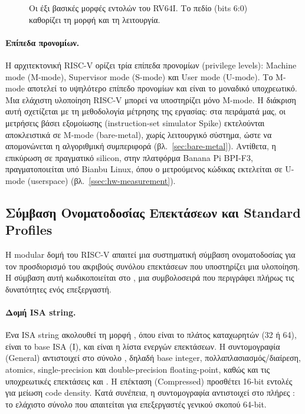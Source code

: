 \begin{figure}[htbp]
  \centering
  
  \caption[Βασικές μορφές εντολών RISC-V]{Οι έξι βασικές μορφές εντολών του RV64I. Το πεδίο  (bits 6:0) καθορίζει τη μορφή και τη λειτουργία.}
  \label{fig:rv64-formats}
\end{figure}

\paragraph{Επίπεδα προνομίων.}
Η αρχιτεκτονική RISC-V ορίζει τρία επίπεδα προνομίων (privilege levels):
Machine mode (M-mode), Supervisor mode (S-mode) και User mode (U-mode). Το
M-mode αποτελεί το υψηλότερο επίπεδο προνομίων και είναι το μοναδικό
υποχρεωτικό. Μια ελάχιστη υλοποίηση RISC-V μπορεί να υποστηρίζει μόνο
M-mode. Η διάκριση αυτή σχετίζεται με τη μεθοδολογία μέτρησης της εργασίας: 
στα πειράματά μας, οι μετρήσεις βάσει εξομοίωσης (instruction-set
simulator Spike) εκτελούνται αποκλειστικά σε M-mode (bare-metal),
χωρίς λειτουργικό σύστημα, ώστε να απομονώνεται η αλγοριθμική συμπεριφορά
(βλ.~\cref{sec:bare-metal}). Αντίθετα, η επικύρωση σε πραγματικό silicon,
στην πλατφόρμα Banana Pi BPI-F3, πραγματοποιείται υπό Bianbu Linux, όπου ο
μετρούμενος κώδικας εκτελείται σε U-mode (userspace) (βλ.~\cref{ssec:hw-measurement}).

\subsection{Σύμβαση Ονοματοδοσίας Επεκτάσεων και Standard Profiles}
\label{sec:extension-naming}

Η modular δομή του RISC-V απαιτεί μια συστηματική σύμβαση ονοματοδοσίας για
τον προσδιορισμό του ακριβούς συνόλου επεκτάσεων που υποστηρίζει μια
υλοποίηση. Η σύμβαση αυτή κωδικοποιείται στο , μια
συμβολοσειρά που περιγράφει πλήρως τις δυνατότητες ενός
επεξεργαστή.

\paragraph{Δομή ISA string.}
Ένα ISA string ακολουθεί τη μορφή ,
όπου  είναι το πλάτος καταχωρητών (32 ή 64),  είναι
το base ISA (I), και  είναι η λίστα ενεργών επεκτάσεων. Η
συντομογραφία  (General) αντιστοιχεί στο σύνολο
, δηλαδή base integer, πολλαπλασιασμός/διαίρεση,
atomics, single-precision και double-precision floating-point, καθώς και τις
υποχρεωτικές επεκτάσεις  και . Η
επέκταση  (Compressed) προσθέτει 16-bit εντολές για μείωση code
density. Κατά συνέπεια, η συντομογραφία  αντιστοιχεί στο
πλήρες : το ελάχιστο σύνολο που απαιτείται για επεξεργαστές
γενικού σκοπού 64-bit.


